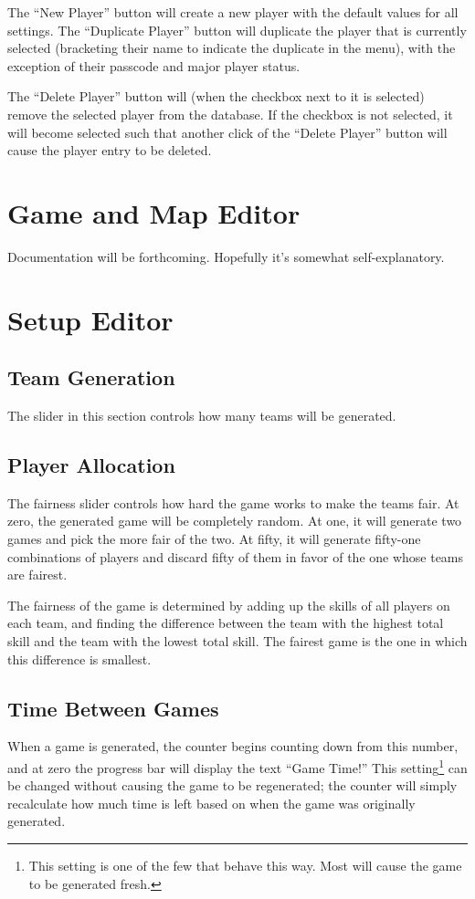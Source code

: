 \documentclass[10pt,a4paper]{report}
\begin{document}
The ``New Player'' button will create a new player with the default values for all settings.  The ``Duplicate Player'' button will duplicate the player that is currently selected (bracketing their name to indicate the duplicate in the menu), with the exception of their passcode and major player status.

The ``Delete Player'' button will (when the checkbox next to it is selected) remove the selected player from the database.  If the checkbox is not selected, it will become selected such that another click of the ``Delete Player'' button will cause the player entry to be deleted.

\chapter{Game and Map Editor}
Documentation will be forthcoming.  Hopefully it's somewhat self-explanatory.

\chapter{Setup Editor}
\section{Team Generation}
The slider in this section controls how many teams will be generated.

\section{Player Allocation}
The fairness slider controls how hard the game works to make the teams fair.  At zero, the generated game will be completely random.  At one, it will generate two games and pick the more fair of the two.  At fifty, it will generate fifty-one combinations of players and discard fifty of them in favor of the one whose teams are fairest.

The fairness of the game is determined by adding up the skills of all players on each team, and finding the difference between the team with the highest total skill and the team with the lowest total skill.  The fairest game is the one in which this difference is smallest.

\section{Time Between Games}
When a game is generated, the counter begins counting down from this number, and at zero the progress bar will display the text ``Game Time!''  This setting\footnote{This setting is one of the few that behave this way.  Most will cause the game to be generated fresh.} can be changed without causing the game to be regenerated; the counter will simply recalculate how much time is left based on when the game was originally generated.
\end{document}
